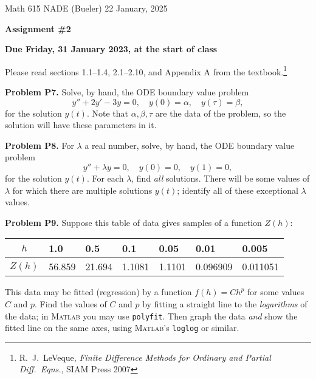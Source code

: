 \documentclass[12pt]{amsart}
\newcommand{\Matlab}{\textsc{Matlab}\xspace}
\newcommand{\prob}[1]{\bigskip\noindent\textbf{#1}\quad }
\begin{document}
\scriptsize \noindent Math 615 NADE (Bueler) \hfill 22 January, 2025
\normalsize

\medskip\bigskip

\Large\centerline{\textbf{Assignment \#2}}
\large
\bigskip

\centerline{\textbf{Due Friday, 31 January 2023, at the start of class}}
\bigskip
\normalsize

\thispagestyle{empty}

\bigskip
Please read sections 1.1--1.4, 2.1--2.10, and Appendix A from the textbook.\footnote{R.~J.~LeVeque, \emph{Finite Difference Methods for Ordinary and Partial Diff.~Eqns.}, SIAM Press 2007}


\prob{Problem P7.}  Solve, by hand, the ODE boundary value problem
\begin{equation*}
y'' + 2 y' - 3 y = 0, \quad y(0)=\alpha, \quad y(\tau)=\beta,
\end{equation*}
for the solution $y(t)$.  Note that $\alpha,\beta,\tau$ are the data of the problem, so the solution will have these parameters in it.


\prob{Problem P8.}  For $\lambda$ a real number, solve, by hand, the ODE boundary value problem
\begin{equation*}
y'' + \lambda y = 0, \quad y(0)=0, \quad y(1)=0,
\end{equation*}
for the solution $y(t)$.  For each $\lambda$, find \emph{all} solutions.  There will be some values of $\lambda$ for which there are multiple solutions $y(t)$; identify all of these exceptional $\lambda$ values.


\prob{Problem P9.}  Suppose this table of data gives samples of a function $Z(h)$:

\smallskip
\begin{center}
\begin{tabular}{c|l|l|l|l|l|l}
$h$ & 1.0     & 0.5    & 0.1    & 0.05   & 0.01     & 0.005 \\ \hline
$Z(h)$ & 56.859  & 21.694 & 1.1081 & 1.1101 & 0.096909 & 0.011051
\end{tabular}
\end{center}

\medskip
\noindent This data may be fitted (regression) by a function $f(h) = C h^p$ for some values $C$ and $p$.  Find the values of $C$ and $p$ by fitting a straight line to the \emph{logarithms} of the data; in \Matlab you may use \texttt{polyfit}.  Then graph the data \emph{and} show the fitted line on the same axes, using \Matlab's \texttt{loglog} or similar.
\end{document}
